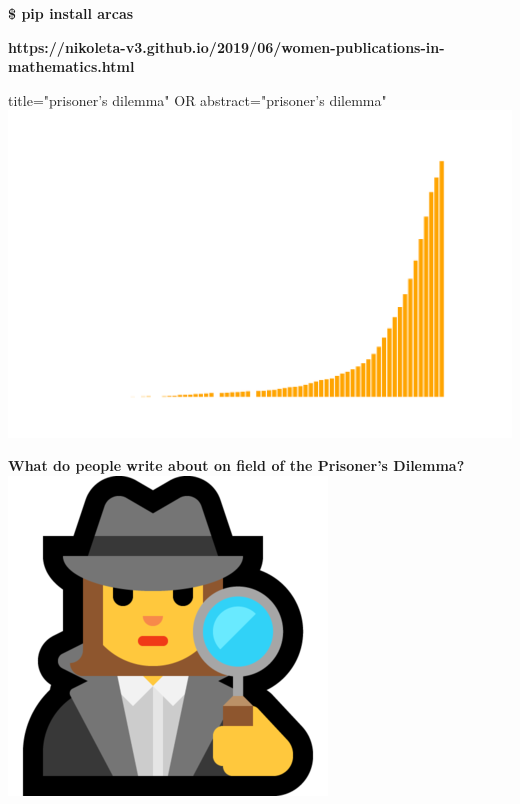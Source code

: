 \documentclass{beamer}
\begin{document}
\begin{frame}
    \begin{center}
        \Large{\textbf{\$ pip install arcas}}
    \end{center}
\end{frame}

\begin{frame}
    \begin{center}
        \textbf{https://nikoleta-v3.github.io/2019/06/women-publications-in-mathematics.html}
    \end{center}
\end{frame}

\begin{frame}
    \begin{center}
    \small{title="prisoner's dilemma" OR abstract="prisoner's dilemma"}\\
    
    \vspace{-.50cm}
    \includegraphics[width=\textwidth]{static/articles.png}
    \end{center}
\end{frame}

\begin{frame}
    \begin{center}
        \Large{\textbf{What do people write about on field of the Prisoner's Dilemma?}} \\ \vspace{1cm}
        \includegraphics[width=.15\textwidth]{static/detective.png} \\ \vspace{.5cm}
    \end{center}
\end{frame}
\end{document}
